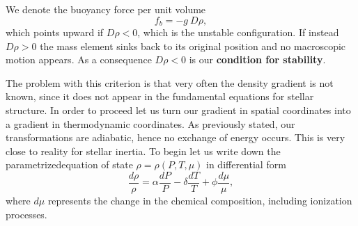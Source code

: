 We denote the buoyancy force per unit volume 
$$
f_b=- g \ D \rho,
$$
which points upward if $D \rho < 0$, which is the unstable configuration. If instead $D \rho > 0$ the mass element sinks back to its original position and no macroscopic motion appears. As a consequence $D \rho<0$ is our \textbf{condition for stability}.

The problem with this criterion is that very often the density gradient is not known, since it does not appear in the fundamental equations for stellar structure. In order to proceed let us turn our gradient in spatial coordinates into a gradient in thermodynamic coordinates. As previously stated, our transformations are adiabatic, hence no exchange of energy occurs. This is very close to reality for stellar inertia. To begin let us write down the parametrizedequation of state $\rho = \rho (P, T, \mu)$ in differential form
\begin{equation}\label{eq:EoSdiff}
	\frac{d \rho}{\rho} = \alpha \frac{d P}{P} - \delta \frac{d T}{T} + \phi \frac{d \mu}{\mu},
\end{equation}
where $d \mu$ represents the change in the chemical composition, including ionization processes. 

